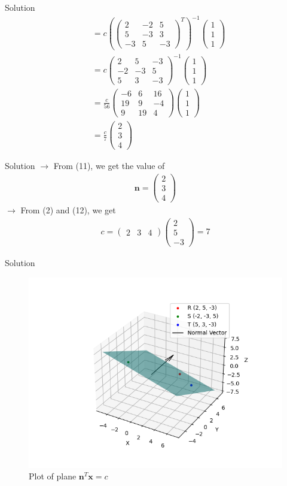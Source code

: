 \documentclass{beamer}
\numberwithin{equation}{section}
\providecommand{\brak}[1]{\ensuremath{\left(#1\right)}}
\theoremstyle{remark}
\newcommand{\myvec}[1]{\ensuremath{\begin{pmatrix}#1\end{pmatrix}}}
\let\vec\mathbf
\begin{document}
\begin{frame}{Solution}
\begin{align}
    &= c \brak{\myvec{2 & -2 & 5 \\ 5 & -3 & 3 \\ -3 & 5 & -3}^{T}}^{-1} \myvec{1\\1\\1} \\
    &= c \myvec{2 & 5 & -3 \\ -2 & -3 & 5 \\ 5 & 3 & -3}^{-1} \myvec{1\\1\\1} \\
    &= \frac{c}{56} \myvec{-6 & 6 & 16 \\ 19 & 9 & -4 \\ 9 & 19 & 4} \myvec{1\\1\\1} \\
    &= \frac{c}{7} \myvec{2\\3\\4}
\end{align}
\end{frame}

\begin{frame}{Solution}
$\rightarrow$ From (11), we get the value of
\begin{align} \vec{n} = \myvec{2 \\ 3 \\ 4} \end{align}
$\rightarrow$ From (2) and (12), we get
\begin{align} c = \myvec{2 & 3 & 4} \myvec{2 \\ 5 \\ -3} = 7 \end{align}
\end{frame}

\begin{frame}{Solution}
\begin{figure}[h!]
   \centering
   \includegraphics[width=0.7\linewidth]{figs/01.png}
   \caption{Plot of plane $\vec{n}^{T}\vec{x} = c$}
   \label{Plot_1}
\end{figure}
\end{frame}
\end{document}
